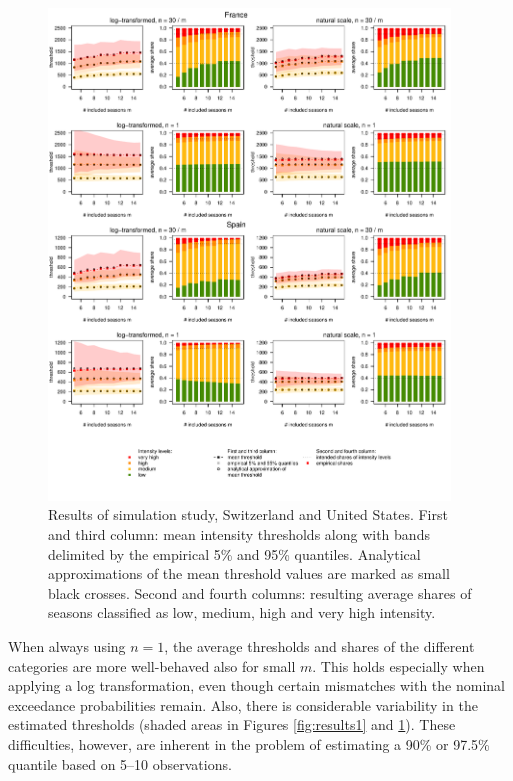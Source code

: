 \documentclass{article}
\begin{document}
\begin{figure}
\centering
\includegraphics[page=2, width=0.95\textwidth]{figure/plot_results.pdf}
\caption{Results of simulation study, Switzerland and United States. First and third column: mean intensity thresholds along with bands delimited by the empirical 5\% and 95\% quantiles. Analytical approximations of the mean threshold values are marked as small black crosses. Second and fourth columns: resulting average shares of seasons classified as low, medium, high and very high intensity.}
\label{fig:results2}
\end{figure}

When always using $n = 1$, the average thresholds and shares of the different categories are more well-behaved also for small $m$. This holds especially when applying a log transformation, even though certain mismatches with the nominal exceedance probabilities remain. Also, there is considerable variability in the estimated thresholds (shaded areas in Figures \ref{fig:results1} and \ref{fig:results2}). These difficulties, however, are inherent in the problem of estimating a 90\% or 97.5\% quantile based on 5--10 observations.
\end{document}

